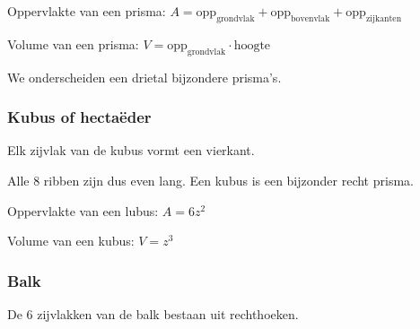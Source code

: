 
		
\begin{ftonthoud}
		Oppervlakte van een prisma: $A=\text{opp}_{\text{grondvlak}}+\text{opp}_{\text{bovenvlak}}+\text{opp}_{\text{zijkanten}}$
		
		Volume van een prisma: $V=\text{opp}_{\text{grondvlak}}\cdot \text{hoogte}$
	
\end{ftonthoud}

We onderscheiden een drietal bijzondere prisma's.

\subsubsection{Kubus of hecta\"eder}
\begin{definitie}
	Elk zijvlak van de kubus vormt een vierkant.
\end{definitie}

Alle 8 ribben zijn dus even lang. Een kubus is een bijzonder recht prisma.



		
\begin{ftonthoud}
		Oppervlakte van een lubus: $A=6z^2$
		
		Volume van een kubus: $V=z^3$
\end{ftonthoud}
		

\subsubsection{Balk}
\begin{definitie}
	De 6 zijvlakken van de balk bestaan uit rechthoeken. 
\end{definitie}


